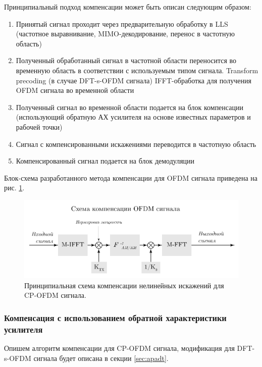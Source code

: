 Принципиальный подход компенсации может быть описан следующим
образом:
\begin{enumerate}
    \item Принятый сигнал проходит через предварительную обработку в LLS
    (частотное выравнивание, MIMO-декодирование, перенос в частотную
    область)
    \item Полученный обработанный сигнал в частотной области переносится во
    временную область в соответствии с используемым типом сигнала.
    \subitem Transform precoding (в случае DFT-s-OFDM сигнала)
    \subitem IFFT-обработка для получения OFDM сигнала во временной области
    \item Полученный сигнал во временной области подается на блок
    компенсации (использующий обратную АХ усилителя на основе известных
    параметров и рабочей точки)
    \item Сигнал с компенсированными искажениями переводится в частотную
    область
    \item Компенсированный сигнал подается на блок демодуляции
\end{enumerate}

Блок-схема разработанного метода компенсации для OFDM сигнала приведена на
рис. \ref{fig:ofdm_compensation_scheme}.

\begin{figure}[h!]
    \centering
    \includegraphics[width=0.99\linewidth]{figs/ofdm_compensation_scheme.pdf}
    \caption{Принципиальная схема компенсации нелинейных искажений для CP-OFDM сигнала.}
    \label{fig:ofdm_compensation_scheme}
\end{figure}

\subsubsection{Компенсация с использованием обратной характеристики усилителя}
Опишем алгоритм компенсации для CP-OFDM сигнала,
модификация для DFT-s-OFDM сигнала будет описана в секции \ref{sec:apadt}.

